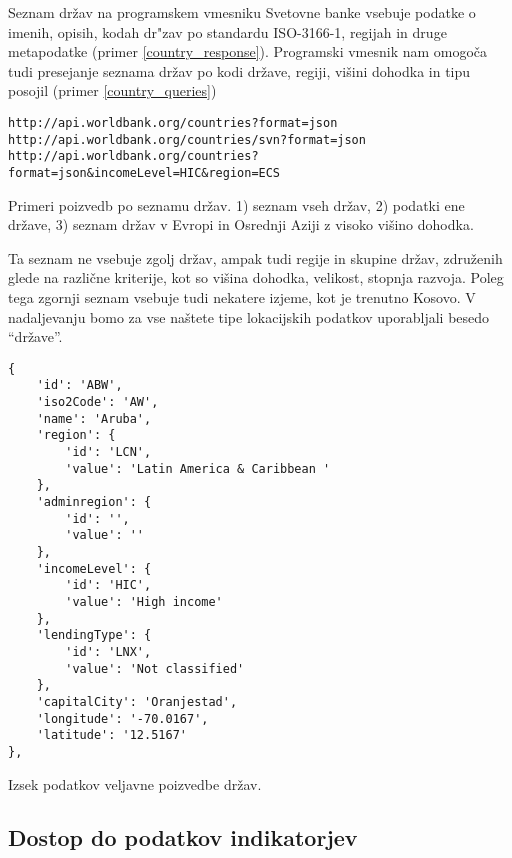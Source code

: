 Seznam držav na programskem vmesniku Svetovne banke vsebuje podatke o imenih, 
opisih, kodah dr"zav po standardu ISO-3166-1, regijah in druge metapodatke 
(primer \ref{country_response}). Programski
vmesnik nam omogoča tudi presejanje seznama držav po kodi države, regiji,
višini dohodka in tipu posojil (primer \ref{country_queries})



\begin{snippet}
\begin{center}
\begin{lstlisting}
http://api.worldbank.org/countries?format=json
http://api.worldbank.org/countries/svn?format=json
http://api.worldbank.org/countries?format=json&incomeLevel=HIC&region=ECS
\end{lstlisting}
\end{center}
\caption{Primeri poizvedb po seznamu držav.
1) seznam vseh držav, 2) podatki ene države,
3) seznam držav v Evropi in Osrednji Aziji z visoko višino dohodka.}
\label{country_queries}
\end{snippet} 


Ta seznam ne vsebuje zgolj držav, ampak tudi regije in skupine držav, 
združenih glede na različne kriterije, kot so višina dohodka, velikost, stopnja
razvoja. Poleg tega zgornji seznam vsebuje tudi nekatere izjeme, kot je trenutno
Kosovo. V nadaljevanju bomo za vse naštete tipe lokacijskih podatkov
uporabljali besedo ``države''. 


\begin{snippet}
\begin{center}
\begin{lstlisting}
{
    'id': 'ABW',
    'iso2Code': 'AW',
    'name': 'Aruba',
    'region': {
        'id': 'LCN',
        'value': 'Latin America & Caribbean '
    },
    'adminregion': {
        'id': '',
        'value': ''
    },
    'incomeLevel': {
        'id': 'HIC',
        'value': 'High income'
    },
    'lendingType': {
        'id': 'LNX',
        'value': 'Not classified'
    },
    'capitalCity': 'Oranjestad',
    'longitude': '-70.0167',
    'latitude': '12.5167'
},
\end{lstlisting}
\end{center}
\caption[some]{Izsek podatkov veljavne poizvedbe držav.}
\label{country_response}
\end{snippet} 


\subsection{Dostop do podatkov indikatorjev}

